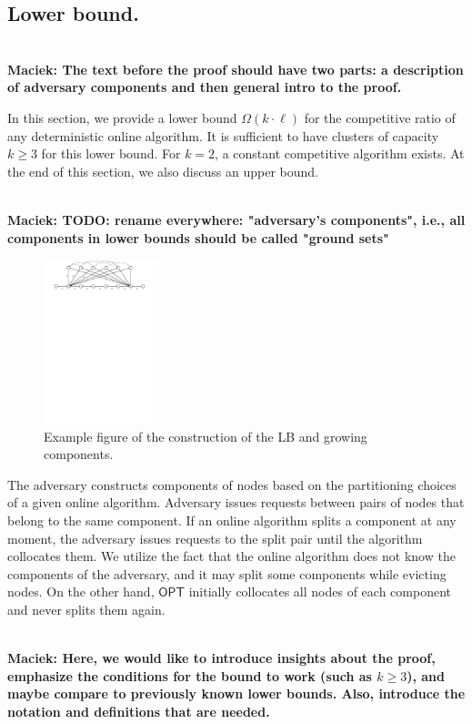 \documentclass[manuscript,screen=true, review, anonymous]{acmart}
\newcommand{\OPT}{\textsf{OPT}\xspace}
\newcommand\maciek[1]{\color{brown}\textbf{\\ Maciek: #1}\color{black}}
\begin{document}
\subsection{Lower bound.}

\label{sec:lowerbound}

\maciek{The text before the proof should have two parts: a description of adversary components and then general intro to the proof.}

In this section, we provide a lower bound $\Omega(k\cdot \ell)$ for the competitive ratio of any deterministic online algorithm.
It is sufficient to have clusters of capacity $k\geq 3$ for this lower bound.
For $k=2$, a constant competitive algorithm exists.
At the end of this section, we also
discuss an upper bound.

\maciek{TODO: rename everywhere: "adversary's components", i.e., all components in lower bounds should be called "ground sets"}



\begin{figure}[H]
  \centering
    \includegraphics[width=0.3\textwidth]{figs/substitute}
    \caption{Example figure of the construction of the LB and growing components.}
    \label{fig:nptree-construction}
  \end{figure}


The adversary constructs components of nodes based on the partitioning choices of a given online algorithm.
Adversary issues requests between pairs of nodes that belong to the same component.
If an online algorithm splits a component at any moment,
the adversary issues requests to the split pair until the algorithm collocates them.
We utilize the fact that the online algorithm does not know the components of the adversary, and it may split some components while evicting nodes.
On the other hand, $\OPT$ initially collocates all nodes of each component and never splits them again.


\maciek{Here, we would like to introduce insights about the proof, emphasize the conditions for the bound to work (such as $k\geq 3$), and maybe compare to previously known lower bounds. Also, introduce the notation and definitions that are needed.}
\end{document}
